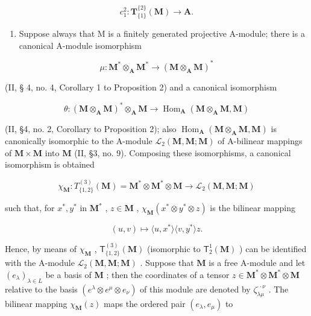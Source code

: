 \[
c _ {1} ^ {2}: \mathbf {T} _ {\{1 \}} ^ {\{2 \}} (\mathbf {M}) \rightarrow \mathbf {A}.
\]

\begin{enumerate}
\def\labelenumi{(\arabic{enumi})}
\setcounter{enumi}{1}
\tightlist
\item
  Suppose always that M is a finitely generated projective A-module; there is a canonical A-module isomorphism
\end{enumerate}

\[
\mu : \mathbf {M} ^ {*} \otimes_ {\mathbf {A}} \mathbf {M} ^ {*} \rightarrow (\mathbf {M} \otimes_ {\mathbf {A}} \mathbf {M}) ^ {*}
\]

(II, § 4, no. 4, Corollary 1 to Proposition 2) and a canonical isomorphism

\[
\theta : (\mathbf {M} \otimes_ {\mathbf {A}} \mathbf {M}) ^ {*} \otimes_ {\mathbf {A}} \mathbf {M} \rightarrow \operatorname{Hom} _ {\mathbf {A}} (\mathbf {M} \otimes_ {\mathbf {A}} \mathbf {M}, \mathbf {M})
\]

(II, §4, no. 2, Corollary to Proposition 2); also \(\operatorname{Hom}_{\mathbf{A}}(\mathbf{M} \otimes_{\mathbf{A}} \mathbf{M}, \mathbf{M})\) is canonically isomorphic to the A-module \(\mathcal{L}_2(\mathbf{M}, \mathbf{M}; \mathbf{M})\) of A-bilinear mappings of \(\mathbf{M} \times \mathbf{M}\) into \(\mathbf{M}\) (II, §3, no. 9). Composing these isomorphisms, a canonical isomorphism is obtained

\[
\chi_ {\mathbf {M}} \colon T _ {\{1, 2 \}} ^ {(3)} (\mathbf {M}) = \mathbf {M} ^ {*} \otimes \mathbf {M} ^ {*} \otimes \mathbf {M} \rightarrow \mathcal {L} _ {2} (\mathbf {M}, \mathbf {M}; \mathbf {M})
\]

such that, for \(x^{*}, y^{*}\) in \(\mathbf{M}^{*}\) , \(z \in \mathbf{M}\) , \(\chi_{\mathbf{M}}(x^{*} \otimes y^{*} \otimes z)\) is the bilinear mapping

\[
(u, v) \mapsto \langle u, x ^ {*} \rangle \langle v, y ^ {*} \rangle z.
\]

Hence, by means of \(\chi_{\mathbf{M}}\) , \(\mathsf{T}_{\{1,2\}}^{(3)}(\mathbf{M})\) (isomorphic to \(\mathsf{T}_{2}^{1}(\mathbf{M})\) ) can be identified with the A-module \(\mathcal{L}_2(\mathbf{M},\mathbf{M};\mathbf{M})\) . Suppose that \(\mathbf{M}\) is a free A-module and let \((e_{\lambda})_{\lambda \in L}\) be a basis of \(\mathbf{M}\) ; then the coordinates of a tensor \(z\in \mathbf{M}^*\otimes \mathbf{M}^*\otimes \mathbf{M}\) relative to the basis \((e^{\lambda}\otimes e^{\mu}\otimes e_{\nu})\) of this module are denoted by \(\zeta_{\lambda \mu}^{\cdot \cdot \nu}\) . The bilinear mapping \(\chi_{\mathbf{M}}(z)\) maps the ordered pair \((e_{\lambda},e_{\mu})\) to

